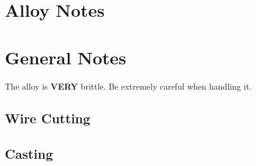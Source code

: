 \section{\MgZnCa Alloy Notes}

\section{General Notes}
The \MgZnCa alloy is \textbf{VERY} brittle. Be extremely careful when handling it. 

\subsection{Wire Cutting}


\subsection{Casting}

